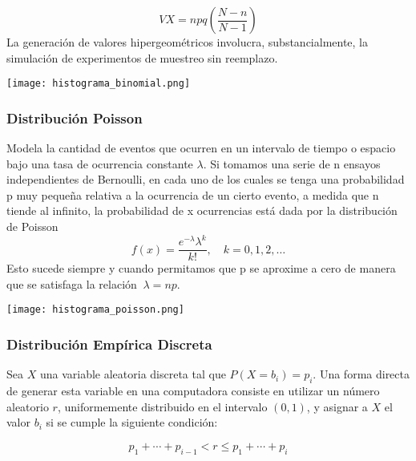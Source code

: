 \documentclass[11pt]{article}
\begin{document}
  \begin{equation}
    VX = npq(\frac{N-n}{N-1})
    \end{equation}
  La generación de valores hipergeométricos involucra, substancialmente, la simulación de experimentos de muestreo sin reemplazo.

\begin{center}
\texttt{[image: histograma\_binomial.png]}
\end{center}

\subsubsection{Distribución Poisson}
Modela la cantidad de eventos que ocurren en un intervalo de tiempo o espacio bajo una tasa de ocurrencia constante \( \lambda \).
 Si tomamos una serie de n ensayos independientes de Bernoulli, en cada uno de los cuales se tenga una probabilidad p muy pequeña relativa a la ocurrencia de un cierto evento,
  a medida que n tiende al infinito, la probabilidad de x ocurrencias está dada por la distribución de Poisson
  \begin{equation}
    f(x) = \frac{e^{-\lambda} \lambda^k}{k!}, \quad k = 0, 1, 2, \ldots
    \end{equation}
Esto sucede siempre y cuando permitamos que p se aproxime a cero de manera que se satisfaga la relación \(\ \lambda = np. \)\

\begin{center}
\texttt{[image: histograma\_poisson.png]}
\end{center}

\subsubsection{Distribución Empírica Discreta}
Sea \( X \) una variable aleatoria discreta tal que \( P(X = b_i) = p_i \).  
Una forma directa de generar esta variable en una computadora consiste en utilizar un número aleatorio \( r \), uniformemente distribuido en el intervalo \( (0, 1) \), y asignar a \( X \) el valor \( b_i \) si se cumple la siguiente condición:

\begin{equation}
p_1 + \cdots + p_{i-1} < r \leq p_1 + \cdots + p_i
\end{equation}
\end{document}
